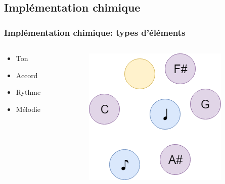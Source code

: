 \documentclass{beamer}
\begin{document}
\subsection{Implémentation chimique}

\begin{frame}
\frametitle{Implémentation chimique: types d'éléments}
\begin{columns}

\begin{column}{5cm}
\begin{itemize}
    \item Ton
    \item Accord
    \item Rythme
    \item Mélodie
\end{itemize}
\end{column}

\begin{column}{5cm}
\begin{center}
\includegraphics[scale=0.4]{img/Initial.png}
\end{center}
\end{column}

\end{columns}
\end{frame}
\end{document}
